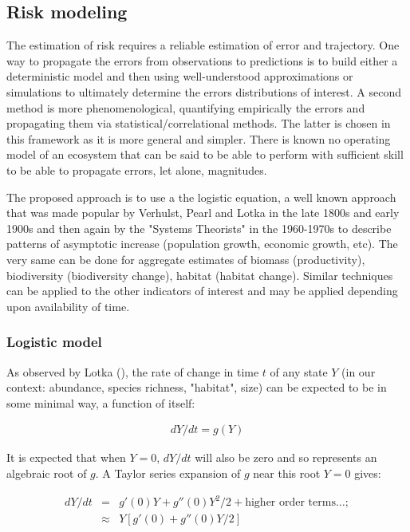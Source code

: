 \documentclass[letterpaper,portrait,11pt]{scrartcl}
\numberwithin{equation}{section}		%
\numberwithin{figure}{section}		%
\numberwithin{table}{section}				%
\begin{document}
\subsection{Risk modeling}
\label{sec:riskapproach}

The estimation of risk requires a reliable estimation of error and trajectory. One way to propagate the errors from observations to predictions is to build either a deterministic model and then using well-understood approximations or simulations to ultimately determine the errors distributions of interest. A second method is more phenomenological, quantifying empirically the errors and propagating them via statistical/correlational methods. The latter is chosen in this framework as it is more general and simpler. There is known no operating model of an ecosystem that can be said to be able to perform with sufficient skill to be able to propagate errors, let alone, magnitudes. 

The proposed approach is to use a the logistic equation, a well known approach that was made popular by Verhulst, Pearl and Lotka in the late 1800s and early 1900s and then again by the "Systems Theorists" in the 1960-1970s to describe patterns of asymptotic increase (population growth, economic growth, etc).  The very same can be done for aggregate estimates of biomass (productivity), biodiversity (biodiversity change), habitat (habitat change). Similar techniques can be applied to the other indicators of interest and may be applied depending upon availability of time.


\subsubsection{Logistic model}

As observed by Lotka (\cite{lotka1925}), the rate of change in time $t$ of any state $Y$ (in our context: abundance, species richness, "habitat", size) can be expected to be in some minimal way, a function of itself:  

\begin{eqnarray} 
\label{eqLogisticContinuous}
dY / dt = g(Y)
\end{eqnarray}

It is expected that when $Y = 0$, $dY/dt$ will also be zero and so represents an algebraic root of $g$. A Taylor series expansion of $g$ near this root $Y=0$ gives:

\begin{eqnarray*} 
  \label{eqLogisticTaylorSeries}
  dY / dt &=&  g'(0) Y + g''(0) Y^{2}/2  + \text{higher order terms} \dots; \\
  &\approx& Y [g'(0) + g''(0) Y/2  ]
\end{eqnarray*}
\end{document}
